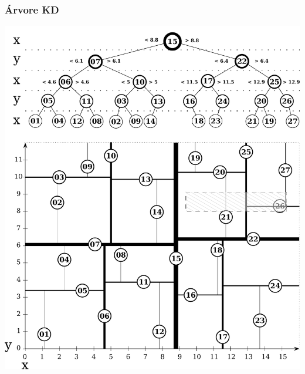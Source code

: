 \documentclass[10pt,xcolor=table,fleqn]{beamer}
\begin{document}
\begin{frame}
  \frametitle{Árvore KD}
  \begin{center}
    \includegraphics[scale=0.3]{../img/points-query/kdt/points-kdt-model}
  \end{center}
\end{frame}
\end{document}
